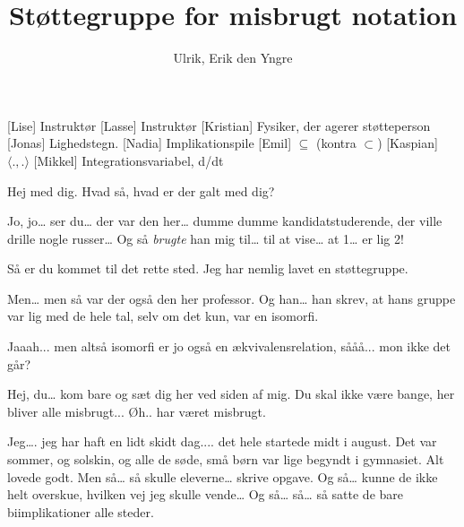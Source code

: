\documentclass[a4paper,11pt]{article}
\title{Støttegruppe for misbrugt notation}
\author{Ulrik, Erik den Yngre}
\begin{document}
\maketitle

\begin{roles}
[Lise] Instruktør
[Lasse] Instruktør
[Kristian] Fysiker, der agerer støtteperson
\role{=}[Jonas] Lighedstegn.
[Nadia] Implikationspile
[Emil] $\subseteq$ (kontra $\subset$)
[Kaspian] $\langle . , . \rangle$
[Mikkel] Integrationsvariabel, d/dt
\end{roles}

\begin{props}
\end{props}


\begin{sketch}



  Hej med dig. Hvad så, hvad er der galt med dig? 

\says{=} Jo, jo… ser du… der var den her… dumme dumme kandidatstuderende, der ville drille nogle russer… Og så \emph{brugte} han mig til… til at vise… at 1… er lig 2! 

 Så er du kommet til det rette sted. Jeg har nemlig lavet en støttegruppe. 

\says{=}  Men… men så var der også den her professor. Og han… han skrev, at hans gruppe var lig med de hele tal, selv om det kun, var en isomorfi.

 Jaaah... men altså isomorfi er jo også en ækvivalensrelation, sååå... mon ikke det går? 



 Hej, du… kom bare og sæt dig her ved siden af mig. Du skal ikke være bange, her bliver alle misbrugt... Øh.. har været misbrugt.


 Jeg…. jeg har haft en lidt skidt dag.... det hele startede midt i august. Det var sommer, og solskin, og alle de søde, små børn var lige begyndt i gymnasiet. Alt lovede godt. Men så… så skulle eleverne… skrive opgave. Og så… kunne de ikke helt overskue, hvilken vej jeg skulle vende… Og så… så… så satte de bare biimplikationer alle steder.


\end{sketch}
\end{document}
